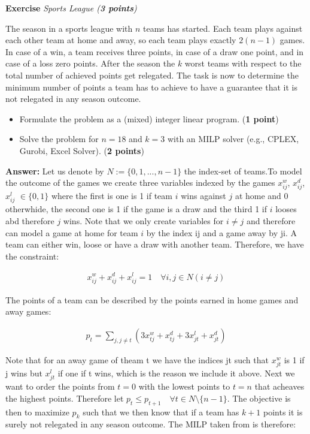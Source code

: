 \documentclass[a4paper,10pt]{article}
\newcounter{exc}
\newenvironment{exercise}[1]%
{\refstepcounter{exc}\textbf{Exercise \arabic{exc}} \emph{#1}\\}
{

\hrulefill\medskip}%
\begin{document}
\begin{exercise}{Sports League (\textbf{3 points})}\label{ex:sl}

The season in a sports league with $n$ teams has started. Each team plays against each other team at home and away, so each team plays exactly $2(n-1)$ games. In case of a win, a team receives three points, in case of a draw one point, and in case of a loss zero points. After the season the $k$ worst teams with respect to the total number of achieved points get relegated. The task is now to determine the minimum number of points a team has to achieve to have a guarantee that it is not relegated in any season outcome.
\begin{itemize}
\item Formulate the problem as a (mixed) integer linear program. (\textbf{1 point})
\item Solve the problem for $n=18$ and $k=3$ with an MILP solver (e.g., CPLEX, Gurobi, Excel Solver). (\textbf{2 points})
\end{itemize}

\textbf{Answer:}
  Let us denote by $N:=\{0,1,...,n-1\}$ the index-set of teams.To model the outcome of the games we create three variables indexed by the games $x^w_{ij}$, $x^d_{ij}$, $x^l_{ij}$ $\in\{0,1\}$ where the first is one is 1 if team $i$ wins against $j$ at home and 0 otherwhide, the second one is 1 if the game is a draw and the third 1 if $i$ looses abd therefore $j$ wins. Note that we only create variables for $i\neq j$ and therefore can model a game at home for team $i$ by the index ij and a game away by ji. A team can either win, loose or have a draw with another team. Therefore, we have the constraint:

\begin{align}
  x^w_{ij}+ x^d_{ij}+ x^l_{ij} = 1\quad \forall i,j\in N(i \neq j)
\end{align}

The points of a team can be described by the points earned in home games and away games:

\begin{align}
p_t = \sum_{j,j\neq t} (3x^w_{tj}+ x^d_{tj} + 3x^l_{jt}+ x^d_{jt})
\end{align}

Note that for an away game of theam t we have the indices jt such that $x^w_{jt}$ is 1 if j wins but $x^l_{jt}$ if one if t wins, which is the reason we include it above.
  Next we want to order the points from $t=0$ with the lowest points to $t=n$ that acheaves the highest points. Therefore let $p_t \leq p_{t+1} \quad \forall t\in N\setminus \{n-1\}$. The objective is then to maximize $p_k$ such that we then know that if a team has $k+1$ points it is surely not relegated in any season outcome.
The MILP taken from \cite{raack2013integer} is therefore:


\end{exercise}
\end{document}
